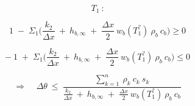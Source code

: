 \begin{adjustwidth}{0cm}{0cm}
	\begin{multicols}{3} %
		
		
		\hspace{-3cm}
		\begin{minipage}{\columnwidth}	
			\vspace{1cm}
			$$T_1 \: \mbox{:}$$ 
		\end{minipage}
		
		\columnbreak %
		
		
		\hspace{-5.5cm}
		\begin{minipage}{\columnwidth}	
			$$
			1 \;-\; \Sigma_1 \Big( \frac{k_{2}}{\Delta x} \:+\: h_{b,\infty} \;+\;  \frac{\Delta x}{2} \:  w_b (T_1^?) \: \rho _b \: c_b \Big) \geq 0
			$$
			
			\vspace{-1cm}
			
			$$
			- \: 1 \;+\; \Sigma_1 \Big( \frac{k_{2}}{\Delta x} \:+\: h_{b,\infty} \;+\;  \frac{\Delta x}{2} \:  w_b (T_1^?) \: \rho _b \: c_b \Big) \leq 0
			$$
			

		\end{minipage}
	
		\columnbreak
		
		\hspace{-1.5cm}
		\begin{minipage}{1.3\columnwidth}
			\vspace{0.7cm}
			$$
			\Rightarrow \;\;\;\; \Delta \theta \:\leq\: \frac{\sum_{k=1}^n \: \rho_k \: c_k \: s_k}{\frac{k_{2}}{\Delta x} \:+\: h_{b,\infty} \;+\;  \frac{\Delta x}{2} \:  w_b (T_1^?) \: \rho _b \: c_b}
			$$
		\end{minipage}
		
	\end{multicols}
\end{adjustwidth}

